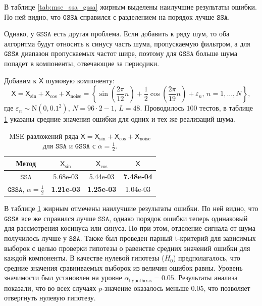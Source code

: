 \documentclass[12pt, specialist, subf
]{disser}
\theoremstyle{definition}
\newcommand{\SSA}{\texttt{SSA}}
\newcommand{\GSSA}{\texttt{GSSA}}
\newcommand{\TS}{\mathsf{X}}
\begin{document}
В таблице \ref{tab:mse_ssa_gssa} жирным выделены наилучшие результаты ошибки. По ней видно, что $\GSSA$ справился с разделением на порядок лучше $\SSA$.

Однако, у $\GSSA$ есть другая проблема. Если добавить к ряду шум, то оба алгоритма будут относить к синусу часть шума, пропускаемую фильтром, а для $\GSSA$ диапазон пропускаемых частот шире, поэтому для $\GSSA$ больше шума попадет в компоненты, отвечающие за периодики.

Добавим к $\TS$ шумовую компоненту: \[\TS = \TS_{\sin} + \TS_{\cos} + \TS_{\mathrm{noise}} =
	\left\{
	\sin\left(\frac{2\pi}{12}n\right) +
	\frac{1}{2}\cos\left(\frac{2\pi}{19}n\right)+
	\varepsilon_n, \,
	n = 1, \dots, N
	\right\}, \]
где $\varepsilon_n \sim \mathrm N(0, 0.1^2)$, $N = 96 \cdot 2 - 1$, $L = 48$.
Проводилось $100$ тестов, в таблице \ref{tab:errs_ssa_gssa} указаны средние значения ошибки для одних и тех же реализаций шума.


\begin{table}[H]
	\caption{MSE разложений ряда $\TS = \TS_{\sin} + \TS_{\cos} + \TS_{\mathrm{noise}}$ для $\SSA$ и $\GSSA$ с $\alpha = \frac{1}{2}$.}
	\label{tab:errs_ssa_gssa}
	\centering
	\begin{tabular}{c|ccc}
		\hline
		Метод                                 & $\TS_{\sin}$      & $\TS_{\cos}$      & $\TS$             \\
		\hline
		$\SSA$                         & 5.68e-03          & 5.44e-03          & \textbf{7.48e-04} \\
		$\GSSA$, $\alpha = \frac{1}{2}$ & \textbf{1.21e-03} & \textbf{1.25e-03} & 1.04e-03          \\
		\hline
	\end{tabular}

\end{table}

В таблице \ref{tab:errs_ssa_gssa} жирным отмечены наилучшие результаты ошибки. По ней видно, что $\GSSA$ все же справился лучше $\SSA$, однако порядок ошибки теперь одинаковый для рассмотрения косинуса или синуса. Но при этом, отделение сигнала от шума получилось лучше у $\SSA$.
Также был проведен парный t-критерий для зависимых выборок с целью проверки гипотезы о равенстве средних значений ошибки для каждой компоненты. В качестве нулевой гипотезы ($H_0$) предполагалось, что средние значения сравниваемых выборок из величин ошибок равны. Уровень значимости был установлен на уровне $\alpha_{\mathrm{hypothesis}} = 0.05$.
Результаты анализа показали, что во всех случаях $p$-значение оказалось меньше 0.05, что позволяет отвергнуть нулевую гипотезу.
\end{document}
